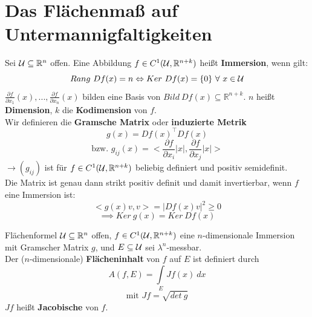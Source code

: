 \chapter{Das Flächenmaß auf Untermannigfaltigkeiten}

  \begin{definition}
    Sei $\mathcal{U} \subseteq \mathbb{R}^n$ offen. Eine Abbildung $f \in C^1(\mathcal{U}, \mathbb{R}^{n+k})$ heißt \textbf{Immersion}, wenn gilt:
    $$Rang \ Df(x) = n \Leftrightarrow Ker \ Df(x) = \{0\} \ \forall \ x \in \mathcal{U}$$
    $\frac{\partial f}{\partial x_1}(x), ..., \frac{\partial f}{\partial x_n}(x)$ bilden eine Basis von $Bild \ Df(x) \subseteq \mathbb{R}^{n+k}$. $n$ heißt \textbf{Dimension}, $k$ die \textbf{Kodimension} von $f$.\\
    Wir definieren die \textbf{Gramsche Matrix} oder \textbf{induzierte Metrik}
    $$g(x) = Df(x)^{\top} Df(x)$$ 
    $$\text{bzw. } g_{ij}(x) = <\frac{\partial f}{\partial x_i}|x|, \frac{\partial f}{\partial x_j}|x|>$$
    $\rightarrow (g_{ij})$ ist für $f \in C^1(\mathcal{U}, \mathbb{R}^{n+k})$ beliebig definiert und positiv semidefinit.\\
    Die Matrix ist genau dann strikt positiv definit und damit invertierbar, wenn $f$ eine Immersion ist:
    $$<g(x)v, v> = |Df(x)v|^2 \geq 0$$
    $$\implies Ker \ g(x) = Ker \ Df(x)$$
  \end{definition}

  \begin{definition}{Flächenformel}
    $\mathcal{U} \subseteq \mathbb{R}^n$ offen, $f \in C^1(\mathcal{U}, \mathbb{R}^{n+k})$ eine $n$-dimensionale Immersion mit Gramscher Matrix $g$, und $E \subseteq \mathcal{U}$ sei $\lambda^n$-messbar.\\
    Der ($n$-dimensionale) \textbf{Flächeninhalt} von $f$ auf $E$ ist definiert durch
    $$A(f,E) = \int\limits_E Jf(x) \ dx$$
    $$\text{mit } Jf = \sqrt{det \ g}$$
    $Jf$ heißt \textbf{Jacobische} von $f$.
  \end{definition}

